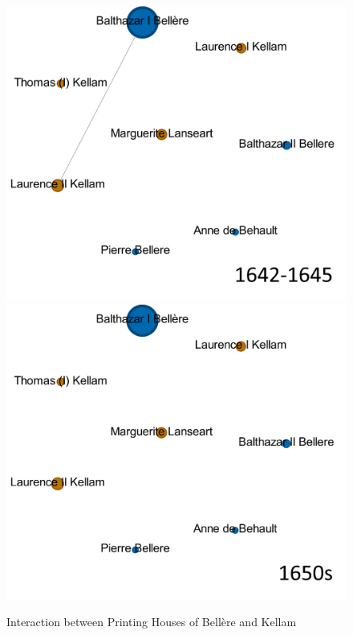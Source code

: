 \documentclass[12pt,a4paper,oneside]{book}
\begin{document}
\begin{sloppypar}
\begin{figure}[H]
\includegraphics[scale=0.32]{graph/B&K_1642-1645.png}
\includegraphics[scale=0.32]{graph/B&K_1650s.png}
\caption{Interaction between Printing Houses of Bellère and Kellam}
\label{fig:interactionBelAndKel}
\end{figure}

\pagebreak

\end{sloppypar}
\end{document}
